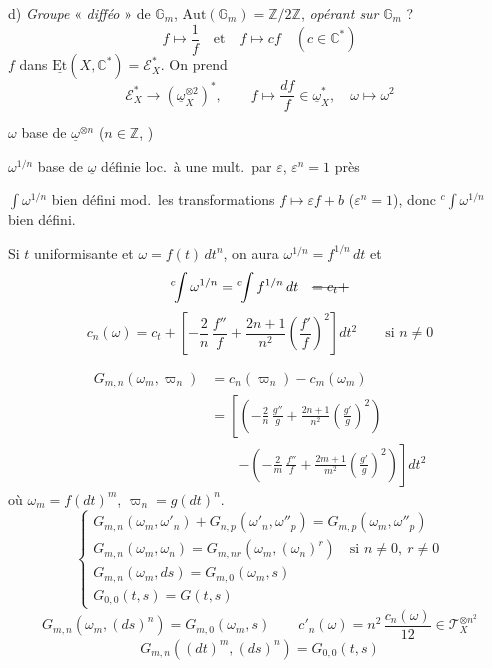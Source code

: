 \documentclass[11pt,a4paper]{article}
\begin{document}
d) \emph{Groupe}   « \emph{difféo} » de $\mathbb{G}_m$, $\mathrm{Aut}(\mathbb{G}_m) = \mathbb{Z}/2\mathbb{Z}$, \emph{opérant sur} $\mathbb{G}_m$ ?
\[
f \longmapsto \frac{1}{f} \quad \text{et} \quad f \longmapsto cf \quad (c \in \mathbb{C}^*)
\]
$f$ dans $\underline{\mathrm{Et}}(X, \mathbb{C}^*) = \mathcal{E}_X^*$. On prend
\[
\mathcal{E}_X^* \longrightarrow (\underline{\omega}_X^{\otimes 2})^*, \qquad
f \longmapsto \frac{df}{f} \in \underline{\omega}_X^*, \quad \omega \longmapsto \omega^2
\]

$\omega$ base de $\underline{\omega}^{\otimes n}$ ($n \in \mathbb{Z}$, )

$\omega^{1/n}$ base de $\underline{\omega}$ définie loc.\ à une mult.\ par $\varepsilon$, $\varepsilon^n = 1$ près

$\int \omega^{1/n}$ bien défini mod.\ les transformations $f \mapsto \varepsilon f + b$ ($\varepsilon^n = 1$), donc ${}^{c}\!\!\int \omega^{1/n}$ bien défini.

Si $t$ uniformisante et $\omega = f(t)\, dt^n$, on aura $\omega^{1/n} = f^{1/n}\, dt$ et \struck{\ill{}}
\[
{}^{c}\!\!\int \omega^{1/n} = {}^{c}\!\!\int f^{1/n}\, dt \quad \text{\struck{$= c_t +$}}
\]
\[
c_n(\omega) = c_t + \left[ -\frac{2}{n}\, \frac{f''}{f} + \frac{2n+1}{n^2} \left( \frac{f'}{f} \right)^2 \right] dt^2 \qquad \text{si } n \neq 0
\]

\[
\begin{aligned}
G_{m,n}(\omega_m, \varpi_n) &= c_n(\varpi_n) - c_m(\omega_m) \\
&= \left[ \left( -\frac{2}{n}\, \frac{g''}{g} + \frac{2n+1}{n^2} \left( \frac{g'}{g} \right)^2 \right) \right. \\
&\qquad \left. - \left( -\frac{2}{m}\, \frac{f''}{f} + \frac{2m+1}{m^2} \left( \frac{g'}{g} \right)^2 \right) \right] dt^2
\end{aligned}
\]
où $\omega_m = f(dt)^m$, $\varpi_n = g(dt)^n$.
\[
\begin{cases}
G_{m,n}(\omega_m, \omega'_n) + G_{n,p}(\omega'_n, \omega''_p) = G_{m,p}(\omega_m, \omega''_p) \\
G_{m,n}(\omega_m, \omega_n) = G_{m,nr}(\omega_m, (\omega_n)^r) \quad \text{si } n \neq 0,\ r \neq 0 \\
G_{m,n}(\omega_m, ds) = G_{m,0}(\omega_m, s) \\
G_{0,0}(t, s) = G(t, s)
\end{cases}
\]
\[
G_{m,n}(\omega_m, (ds)^n) = G_{m,0}(\omega_m, s) \qquad c'_n(\omega) = n^2\, \frac{c_n(\omega)}{12} \in \mathcal{T}_X^{\otimes n^2}
\]
\[
G_{m,n}((dt)^m, (ds)^n) = G_{0,0}(t, s)
\]
\end{document}
